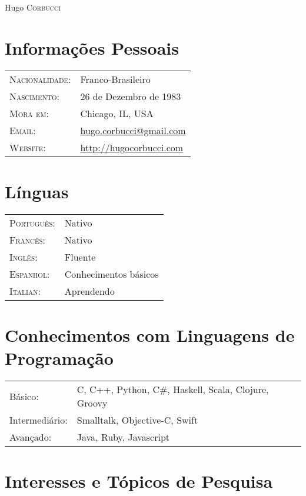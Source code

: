 \documentclass[letter,10pt]{article}
\begin{document}
\par{\centering
		{\Huge Hugo \textsc{Corbucci}
	}\bigskip\par}

\section{Informações Pessoais}

\begin{tabular}{p{2.5cm}l}
  \textsc{Nacionalidade:} & Franco-Brasileiro
  \\
  \textsc{Nascimento:} & 26 de Dezembro de 1983\\
  \textsc{Mora em:}   & Chicago, IL, USA \\
  \textsc{Email:}     &
  \href{mailto:hugo.corbucci@gmail.com}{hugo.corbucci@gmail.com}\\
  \textsc{Website:} & \href{http://hugocorbucci.com}{http://hugocorbucci.com}
\end{tabular}

\section{Línguas}
\begin{tabular}{p{2.5cm}l}
 \textsc{Português:}&Nativo\\
 \textsc{Francês:}&Nativo\\
 \textsc{Inglês:}&Fluente\\
 \textsc{Espanhol:}&Conhecimentos básicos\\
 \textsc{Italian:}&Aprendendo\\
\end{tabular}

\section{Conhecimentos com Linguagens de Programação}
\begin{tabular}{p{2.5cm}l}
 Básico:& C, C++, Python, C\#, Haskell, Scala, Clojure, Groovy\\
 Intermediário:& Smalltalk, Objective-C, Swift\\
 Avançado:& Java, Ruby, Javascript\\
\end{tabular}

\section{Interesses e Tópicos de Pesquisa}
\end{document}
